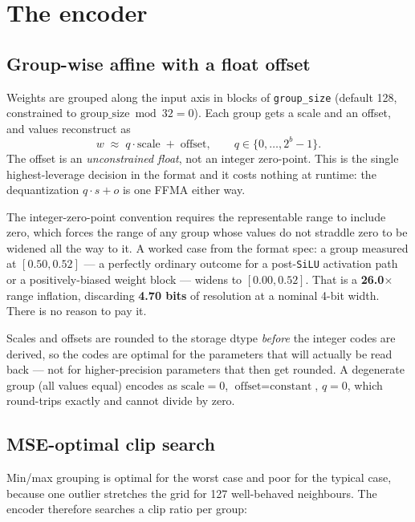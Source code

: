 \documentclass[11pt]{article}
\newcommand{\x}{$\times$}
\newcommand{\code}[1]{\texttt{#1}}
\begin{document}
\newpage
\section{The encoder}
\label{sec:encoder}

\subsection{Group-wise affine with a float offset}

Weights are grouped along the input axis in blocks of \code{group\_size} (default 128,
constrained to $\text{group\_size} \bmod 32 = 0$). Each group gets a scale and an offset, and
values reconstruct as
\begin{equation}
w \;\approx\; q \cdot \text{scale} \;+\; \text{offset},
\qquad q \in \{0, \dots, 2^b - 1\}.
\end{equation}
The offset is an \emph{unconstrained float}, not an integer zero-point. This is the single
highest-leverage decision in the format and it costs nothing at runtime: the dequantization
$q \cdot s + o$ is one FFMA either way.

The integer-zero-point convention requires the representable range to include zero, which forces
the range of any group whose values do not straddle zero to be widened all the way to it. A
worked case from the format spec: a group measured at $[0.50, 0.52]$ --- a perfectly ordinary
outcome for a post-\code{SiLU} activation path or a positively-biased weight block --- widens to
$[0.00, 0.52]$. That is a \textbf{26.0\x} range inflation, discarding \textbf{4.70 bits} of
resolution at a nominal 4-bit width. There is no reason to pay it.

Scales and offsets are rounded to the storage dtype \emph{before} the integer codes are derived,
so the codes are optimal for the parameters that will actually be read back --- not for
higher-precision parameters that then get rounded. A degenerate group (all values equal) encodes
as $\text{scale}=0$, $\text{offset}=\text{constant}$, $q=0$, which round-trips exactly and cannot
divide by zero.

\subsection{MSE-optimal clip search}

Min/max grouping is optimal for the worst case and poor for the typical case, because one outlier
stretches the grid for 127 well-behaved neighbours. The encoder therefore searches a clip ratio
per group:
\end{document}

